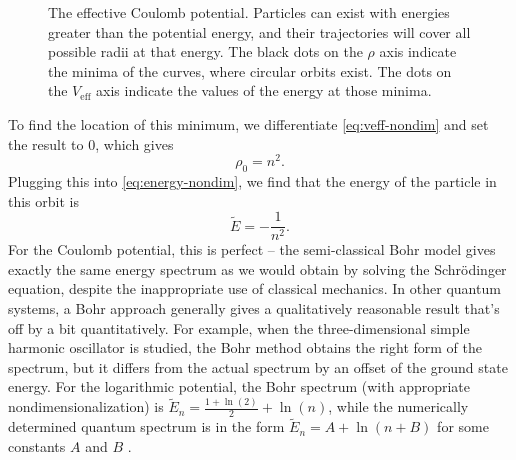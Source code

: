 \documentclass[12pt,twoside]{reedthesis}
\newcommand{\eqn}[1]{\begin{equation}#1\end{equation}}
\begin{document}
\begin{figure}[h]
\caption[The effective Coulomb potential]{The effective Coulomb potential. Particles can exist with energies greater than the potential energy, and their trajectories will cover all possible radii at that energy. The black dots on the $\rho$ axis indicate the minima of the curves, where circular orbits exist. The dots on the $V_{\mathrm{eff}}$ axis indicate the values of the energy at those minima.}
\label{fig:hveff}
\end{figure}

To find the location of this minimum, we differentiate \eqref{eq:veff-nondim} and set the result to $0$, which gives
\eqn{
\rho_0 = n^2\mbox{.}
\label{eq:rho-n}
}
Plugging this into \eqref{eq:energy-nondim}, we find that the energy of the particle in this orbit is
\eqn{
\tilde{E} = -\frac{1}{n^2}\mbox{.}
}
For the Coulomb potential, this is perfect -- the semi-classical Bohr model gives exactly the same energy spectrum as we would obtain by solving the Schr\"odinger equation, despite the inappropriate use of classical mechanics. In other quantum systems, a Bohr approach generally gives a qualitatively reasonable result that's off by a bit quantitatively. For example, when the three-dimensional simple harmonic oscillator is studied, the Bohr method obtains the right form of the spectrum, but it differs from the actual spectrum by an offset of the ground state energy. For the logarithmic potential, the Bohr spectrum (with appropriate nondimensionalization) is $\tilde{E}_n = \frac{1 + \ln(2)}{2}+\ln(n)$, while the numerically determined quantum spectrum is in the form $\tilde{E}_n = A + \ln(n+B)$ for some constants $A$ and $B$ \cite{Garon}.
\end{document}
